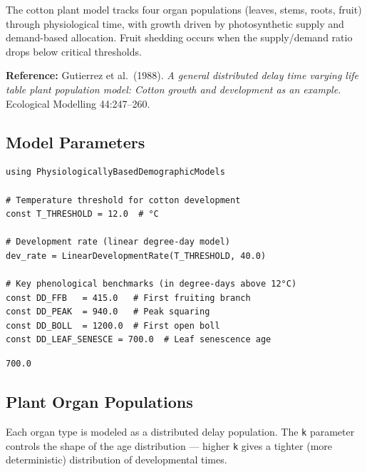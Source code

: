 The cotton plant model tracks four organ populations (leaves, stems, roots, fruit) through physiological time, with growth driven by photosynthetic supply and demand-based allocation. Fruit shedding occurs when the supply/demand ratio drops below critical thresholds.



\textbf{Reference:} Gutierrez et al.~(1988). \emph{A general distributed delay time varying life table plant population model: Cotton growth and development as an example.} Ecological Modelling 44:247–260.



\subsection{Model Parameters}



\label{8409430649752429329}{}



\begin{verbatim}
using PhysiologicallyBasedDemographicModels

# Temperature threshold for cotton development
const T_THRESHOLD = 12.0  # °C

# Development rate (linear degree-day model)
dev_rate = LinearDevelopmentRate(T_THRESHOLD, 40.0)

# Key phenological benchmarks (in degree-days above 12°C)
const DD_FFB   = 415.0   # First fruiting branch
const DD_PEAK  = 940.0   # Peak squaring
const DD_BOLL  = 1200.0  # First open boll
const DD_LEAF_SENESCE = 700.0  # Leaf senescence age
\end{verbatim}




\begin{verbatim}
700.0
\end{verbatim}



\subsection{Plant Organ Populations}



\label{654175354337295620}{}


Each organ type is modeled as a distributed delay population. The \texttt{k} parameter controls the shape of the age distribution — higher \texttt{k} gives a tighter (more deterministic) distribution of developmental times.




